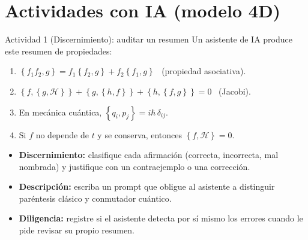 \documentclass[spanish]{beamer}
\newcommand{\Ham}{\mathcal{H}}
\newcommand{\pb}[2]{\left\{#1,#2\right\}}   %
\begin{document}
\section{Actividades con IA (modelo 4D)}

\begin{frame}{Actividad 1 (Discernimiento): auditar un resumen}
Un asistente de IA produce este resumen de propiedades:
\begin{enumerate}
  \item[(a)] $\pb{f_1f_2}{g} = f_1\pb{f_2}{g} + f_2\pb{f_1}{g}$ \ (propiedad asociativa).
  \item[(b)] $\pb{f}{\pb{g}{\Ham}} + \pb{g}{\pb{h}{f}} + \pb{h}{\pb{f}{g}} = 0$ \ (Jacobi).
  \item[(c)] En mecánica cuántica, $\pb{q_i}{p_j} = i\hbar\,\delta_{ij}$.
  \item[(d)] Si $f$ no depende de $t$ y se conserva, entonces $\pb{f}{\Ham} = 0$.
\end{enumerate}
\begin{itemize}
  \item<2-> \textbf{Discernimiento:} clasifique cada afirmación (correcta, incorrecta,
        mal nombrada) y justifique con un contraejemplo o una corrección.
  \item<3-> \textbf{Descripción:} escriba un prompt que obligue al asistente a
        distinguir paréntesis clásico y conmutador cuántico.
  \item<4-> \textbf{Diligencia:} registre si el asistente detecta por sí mismo los
        errores cuando le pide revisar su propio resumen.
\end{itemize}
\end{frame}
\end{document}
